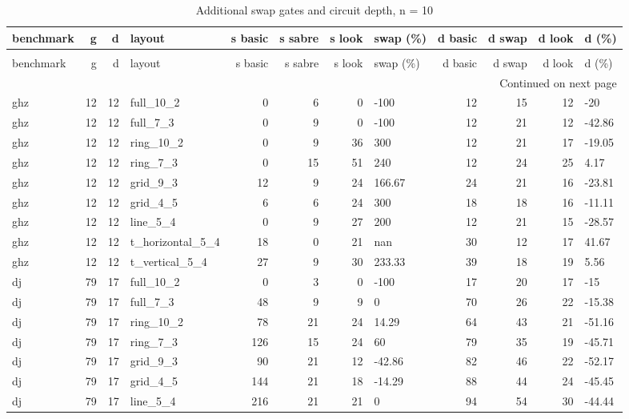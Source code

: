 \begin{longtable}{lrrlrrrlrrrl}
\caption{Additional swap gates and circuit depth, n = 10} \label{benchmark-table-10} \\
\toprule
benchmark & g & d & layout & s basic & s sabre & s look & swap (\%) & d basic & d swap & d look & d (\%) \\
\midrule
\endfirsthead
\caption[]{Additional swap gates and circuit depth, n = 10} \\
\toprule
benchmark & g & d & layout & s basic & s sabre & s look & swap (\%) & d basic & d swap & d look & d (\%) \\
\midrule
\endhead
\midrule
\multicolumn{12}{r}{Continued on next page} \\
\midrule
\endfoot
\bottomrule
\endlastfoot
ghz & 12 & 12 & full\_10\_2 & 0 & 6 & 0 & -100 & 12 & 15 & 12 & -20 \\
ghz & 12 & 12 & full\_7\_3 & 0 & 9 & 0 & -100 & 12 & 21 & 12 & -42.86 \\
ghz & 12 & 12 & ring\_10\_2 & 0 & 9 & 36 & 300 & 12 & 21 & 17 & -19.05 \\
ghz & 12 & 12 & ring\_7\_3 & 0 & 15 & 51 & 240 & 12 & 24 & 25 & 4.17 \\
ghz & 12 & 12 & grid\_9\_3 & 12 & 9 & 24 & 166.67 & 24 & 21 & 16 & -23.81 \\
ghz & 12 & 12 & grid\_4\_5 & 6 & 6 & 24 & 300 & 18 & 18 & 16 & -11.11 \\
ghz & 12 & 12 & line\_5\_4 & 0 & 9 & 27 & 200 & 12 & 21 & 15 & -28.57 \\
ghz & 12 & 12 & t\_horizontal\_5\_4 & 18 & 0 & 21 & nan & 30 & 12 & 17 & 41.67 \\
ghz & 12 & 12 & t\_vertical\_5\_4 & 27 & 9 & 30 & 233.33 & 39 & 18 & 19 & 5.56 \\
dj & 79 & 17 & full\_10\_2 & 0 & 3 & 0 & -100 & 17 & 20 & 17 & -15 \\
dj & 79 & 17 & full\_7\_3 & 48 & 9 & 9 & 0 & 70 & 26 & 22 & -15.38 \\
dj & 79 & 17 & ring\_10\_2 & 78 & 21 & 24 & 14.29 & 64 & 43 & 21 & -51.16 \\
dj & 79 & 17 & ring\_7\_3 & 126 & 15 & 24 & 60 & 79 & 35 & 19 & -45.71 \\
dj & 79 & 17 & grid\_9\_3 & 90 & 21 & 12 & -42.86 & 82 & 46 & 22 & -52.17 \\
dj & 79 & 17 & grid\_4\_5 & 144 & 21 & 18 & -14.29 & 88 & 44 & 24 & -45.45 \\
dj & 79 & 17 & line\_5\_4 & 216 & 21 & 21 & 0 & 94 & 54 & 30 & -44.44 \\

\end{longtable}
